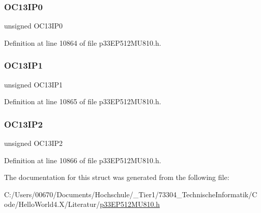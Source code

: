 \subsubsection{\texorpdfstring{O\+C13\+I\+P0}{OC13IP0}}
{\footnotesize\ttfamily unsigned O\+C13\+I\+P0}



Definition at line 10864 of file p33\+E\+P512\+M\+U810.\+h.

\mbox{\label{structtag_i_p_c33_b_i_t_s_abcffe8f01d0f24770796ab9dc97f37a2}} 
\subsubsection{\texorpdfstring{O\+C13\+I\+P1}{OC13IP1}}
{\footnotesize\ttfamily unsigned O\+C13\+I\+P1}



Definition at line 10865 of file p33\+E\+P512\+M\+U810.\+h.

\mbox{\label{structtag_i_p_c33_b_i_t_s_aab94968abd05da19d352f84d7acf54e9}} 
\subsubsection{\texorpdfstring{O\+C13\+I\+P2}{OC13IP2}}
{\footnotesize\ttfamily unsigned O\+C13\+I\+P2}



Definition at line 10866 of file p33\+E\+P512\+M\+U810.\+h.



The documentation for this struct was generated from the following file\+:\begin{DoxyCompactItemize}
\item 
C\+:/\+Users/00670/\+Documents/\+Hochschule/\+\_\+\+Tier1/73304\+\_\+\+Technische\+Informatik/\+Code/\+Hello\+World4.\+X/\+Literatur/\hyperlink{p33_e_p512_m_u810_8h}{p33\+E\+P512\+M\+U810.\+h}\end{DoxyCompactItemize}
